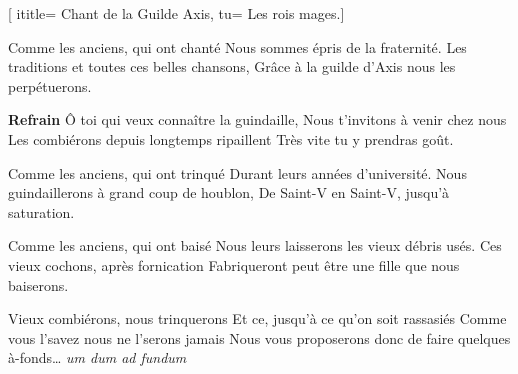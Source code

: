  [
ititle= {Chant de la Guilde Axis},
tu= {Les rois mages.}]


\beginverse
Comme les anciens, qui ont chanté
Nous sommes épris de la fraternité.
Les traditions et toutes ces belles chansons,
Grâce à la guilde d’Axis nous les perpétuerons.
\endverse

\beginchorus
\textbf {Refrain}
Ô toi qui veux connaître la guindaille,
Nous t’invitons à venir chez nous
Les combiérons depuis longtemps ripaillent
Très vite tu y prendras goût.
\endchorus

\beginverse
Comme les anciens, qui ont trinqué
Durant leurs années d’université.
Nous guindaillerons à grand coup de houblon,
De Saint-V en Saint-V, jusqu’à saturation.
\endverse

\beginverse
Comme les anciens, qui ont baisé
Nous leurs laisserons les vieux débris usés.
Ces vieux cochons, après fornication
Fabriqueront peut être une fille que nous baiserons.
\endverse

\beginverse
Vieux combiérons, nous trinquerons
Et ce, jusqu’à ce qu’on soit rassasiés
Comme vous l’savez nous ne l’serons jamais
Nous vous proposerons donc de faire quelques à-fonds…
\textit {um dum ad fundum}
\endverse

\endsong